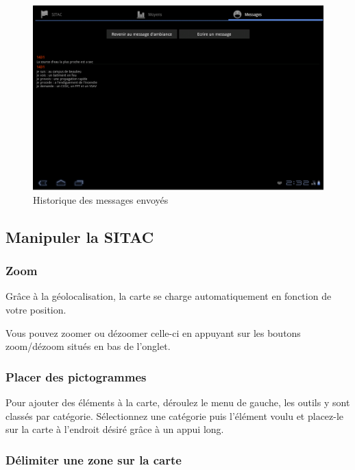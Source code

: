 \documentclass{article}
\begin{document}
\begin{figure}[h!]
\begin{center}
\includegraphics[width=450pt]{Manueldutilisation-fig004.png}
\caption{Historique des messages envoyés}
\end{center}
\end{figure}

\newpage
\subsection{Manipuler la SITAC}


\subsubsection{Zoom}

Grâce à la géolocalisation, la carte se charge automatiquement en fonction de votre position.

Vous pouvez zoomer ou dézoomer celle-ci en appuyant sur les boutons zoom/dézoom situés en bas de l’onglet.

\subsubsection{Placer des pictogrammes}

Pour ajouter des éléments à la carte, déroulez le menu de gauche, les outils y sont classés par catégorie. Sélectionnez une catégorie puis l’élément voulu et placez-le sur la carte à l’endroit désiré grâce à un appui long.


\subsubsection{Délimiter une zone sur la carte}
\end{document}
